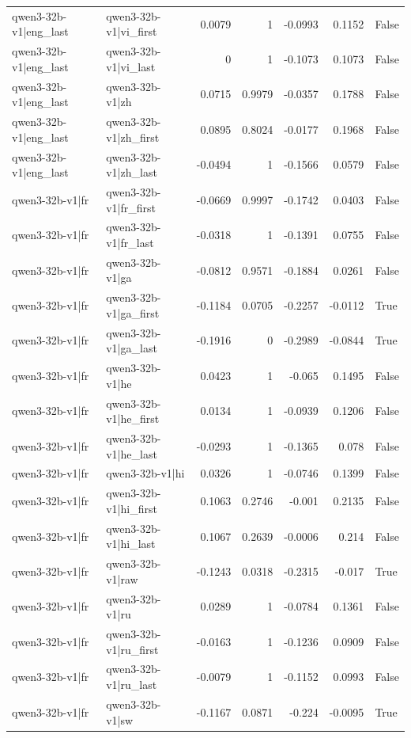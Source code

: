 \begin{table}
\begin{tabular}{l l r r r r l}
qwen3-32b-v1|eng_last & qwen3-32b-v1|vi_first & 0.0079 & 1 & -0.0993 & 0.1152 & False \\
qwen3-32b-v1|eng_last & qwen3-32b-v1|vi_last & 0 & 1 & -0.1073 & 0.1073 & False \\
qwen3-32b-v1|eng_last & qwen3-32b-v1|zh & 0.0715 & 0.9979 & -0.0357 & 0.1788 & False \\
qwen3-32b-v1|eng_last & qwen3-32b-v1|zh_first & 0.0895 & 0.8024 & -0.0177 & 0.1968 & False \\
qwen3-32b-v1|eng_last & qwen3-32b-v1|zh_last & -0.0494 & 1 & -0.1566 & 0.0579 & False \\
qwen3-32b-v1|fr & qwen3-32b-v1|fr_first & -0.0669 & 0.9997 & -0.1742 & 0.0403 & False \\
qwen3-32b-v1|fr & qwen3-32b-v1|fr_last & -0.0318 & 1 & -0.1391 & 0.0755 & False \\
qwen3-32b-v1|fr & qwen3-32b-v1|ga & -0.0812 & 0.9571 & -0.1884 & 0.0261 & False \\
qwen3-32b-v1|fr & qwen3-32b-v1|ga_first & -0.1184 & 0.0705 & -0.2257 & -0.0112 & True \\
qwen3-32b-v1|fr & qwen3-32b-v1|ga_last & -0.1916 & 0 & -0.2989 & -0.0844 & True \\
qwen3-32b-v1|fr & qwen3-32b-v1|he & 0.0423 & 1 & -0.065 & 0.1495 & False \\
qwen3-32b-v1|fr & qwen3-32b-v1|he_first & 0.0134 & 1 & -0.0939 & 0.1206 & False \\
qwen3-32b-v1|fr & qwen3-32b-v1|he_last & -0.0293 & 1 & -0.1365 & 0.078 & False \\
qwen3-32b-v1|fr & qwen3-32b-v1|hi & 0.0326 & 1 & -0.0746 & 0.1399 & False \\
qwen3-32b-v1|fr & qwen3-32b-v1|hi_first & 0.1063 & 0.2746 & -0.001 & 0.2135 & False \\
qwen3-32b-v1|fr & qwen3-32b-v1|hi_last & 0.1067 & 0.2639 & -0.0006 & 0.214 & False \\
qwen3-32b-v1|fr & qwen3-32b-v1|raw & -0.1243 & 0.0318 & -0.2315 & -0.017 & True \\
qwen3-32b-v1|fr & qwen3-32b-v1|ru & 0.0289 & 1 & -0.0784 & 0.1361 & False \\
qwen3-32b-v1|fr & qwen3-32b-v1|ru_first & -0.0163 & 1 & -0.1236 & 0.0909 & False \\
qwen3-32b-v1|fr & qwen3-32b-v1|ru_last & -0.0079 & 1 & -0.1152 & 0.0993 & False \\
qwen3-32b-v1|fr & qwen3-32b-v1|sw & -0.1167 & 0.0871 & -0.224 & -0.0095 & True \\

\end{tabular}
\end{table}
